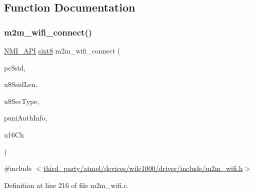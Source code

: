 \subsection{Function Documentation}
\mbox{\label{group__WifiConnectFn_ga19c9871147efe70f5d9c2cc2cdd5bff0}} 
\subsubsection{\texorpdfstring{m2m\+\_\+wifi\+\_\+connect()}{m2m\_wifi\_connect()}}
{\footnotesize\ttfamily \hyperlink{group__BSPDefine_gaecc0323d771e41ef81a76b5f12783e22}{N\+M\+I\+\_\+\+A\+PI} \hyperlink{group__DataT_gae35f10ffd0ac8dd2bc3e794da9bdfbc7}{sint8} m2m\+\_\+wifi\+\_\+connect (\begin{DoxyParamCaption}\item[{char $\ast$}]{pc\+Ssid,  }\item[{\hyperlink{group__DataT_ga4df709a77647e870bbf1d955b8edc9a6}{uint8}}]{u8\+Ssid\+Len,  }\item[{\hyperlink{group__DataT_ga4df709a77647e870bbf1d955b8edc9a6}{uint8}}]{u8\+Sec\+Type,  }\item[{\hyperlink{uniontuniM2MWifiAuth}{tuni\+M2\+M\+Wifi\+Auth} $\ast$}]{puni\+Auth\+Info,  }\item[{\hyperlink{group__DataT_ga1daa745171fc6e31d942c161422a76f9}{uint16}}]{u16\+Ch }\end{DoxyParamCaption})}



{\ttfamily \#include $<$\hyperlink{m2m__wifi_8h}{third\+\_\+party/atmel/devices/wilc1000/driver/include/m2m\+\_\+wifi.\+h}$>$}



Definition at line 216 of file m2m\+\_\+wifi.\+c.


